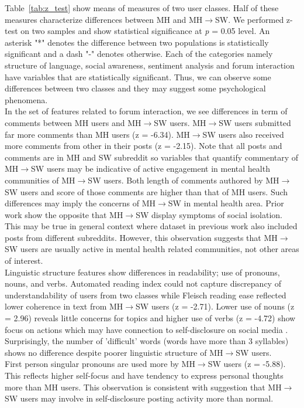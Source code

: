 Table~\ref{tab:z_test} show means of measures of two user classes. Half of these measures characterize differences between MH and MH$\rightarrow$SW. We performed z-test on two samples and show statistical significance at \textit{p} = 0.05 level. An asterisk "*" denotes the difference between two populations is statistically significant and a dash "-" denotes otherwise. Each of the categories namely structure of language, social awareness, sentiment analysis and forum interaction have variables that are statistically significant. Thus, we can observe some differences between two classes and they may suggest some psychological phenomena.\\
In the set of features related to forum interaction, we see differences in term of comments between MH users and MH$\rightarrow$SW users. MH$\rightarrow$SW users submitted far more comments than MH users (z = -6.34). MH$\rightarrow$SW users also received more comments from other in their posts (z = -2.15). Note that all posts and comments are in MH and SW subreddit so variables that quantify commentary of  MH$\rightarrow$SW users may be indicative of active engagement in mental health communities of  MH$\rightarrow$SW users. Both length of comments authored by MH$\rightarrow$SW users and score of those comments are higher than that of MH users. Such differences may imply the concerns of MH$\rightarrow$SW in mental health area. Prior work \cite{DeChoudhury2016} show the opposite that MH$\rightarrow$SW display symptoms of social isolation. This may be true in general context where dataset in previous work also included posts from different subreddits. However, this observation suggests that MH$\rightarrow$SW users are usually active in mental health related communities, not other areas of interest.\\
Linguistic structure features show differences in readability; use of pronouns, nouns, and verbs. Automated reading index could not capture discrepancy of understandability of users from two classes while Fleisch reading ease reflected lower coherence in text from MH$\rightarrow$SW users (z = -2.71). Lower use of nouns (z = 2.96) reveals little concerns for topics \cite{Coppersmith2014}and higher use of verbs (z = -4.72) show focus on actions which may have connection to self-disclosure on social media \cite{Houghton2012}. Surprisingly, the number of 'difficult' words (words have more than 3 syllables) shows no difference despite poorer linguistic structure of MH$\rightarrow$SW users.\\
First person singular pronouns are used more by MH$\rightarrow$SW users (z = -5.88). This reflects higher self-focus and have tendency to express personal thoughts more than MH users. This observation is consistent with suggestion that MH$\rightarrow$SW users may involve in self-disclosure posting activity more than normal.\\
